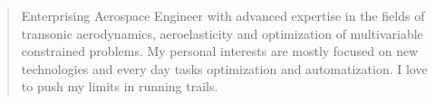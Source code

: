 \documentclass[10pt,a4paper,ragged2e,withhyper]{altacv}
\begin{document}
\begin{paracol}{2}
\printbibliography[heading=pubtype,title={\printinfo{\faBook}{Books}},type=book]

\divider

\printbibliography[heading=pubtype,title={\printinfo{\faFile*[regular]}{Journal Articles}},type=article]

\divider

\printbibliography[heading=pubtype,title={\printinfo{\faUsers}{Conference Proceedings}},type=inproceedings]

\divider

\printbibliography[heading=pubtype,title={\printinfo{\faFile*[regular]}{Others}},type=manual]

\switchcolumn


\begin{quote}
Enterprising Aerospace Engineer with advanced expertise in the fields of transonic aerodynamics, aeroelasticity and optimization of multivariable constrained problems. My personal interests are mostly focused on new technologies and every day tasks optimization and automatization. I love to push my limits in running trails.
\end{quote}



\divider


\divider




\divider\smallskip







\end{paracol}
\end{document}
